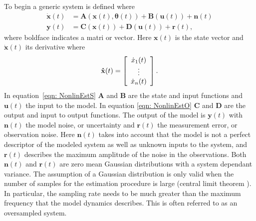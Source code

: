To begin a generic system is defined where \begin{align}
\label{eqn: NonlinEstS}
\mathbf{\dot{x}}(t) &= \mathbf{A}(\mathbf{x}(t),\mathbf{\theta}(t)) + \mathbf{B}(\mathbf{u}(t)) + \mathbf{n}(t)\\
\label{eqn: NonlinEstO}
\mathbf{y}(t)  &= \mathbf{C}(\mathbf{x}(t)) +\mathbf{D}(\mathbf{u}(t))+\mathbf{r}(t),
\end{align} where boldface indicates a matri or vector. Here $\mathbf{x}(t)$ is the state vector and $\dot{\mathbf{x}}(t)$ its derivative where
\[ \mathbf{\dot{x}}(t) = \left[ \begin{array}[pos]{c}
\dot{x}_{1}(t)\\
\vdots \\
\dot{x}_{n}(t) \end{array} \right] .\] In equation~\ref{eqn: NonlinEstS} $\mathbf{A}$ and $\mathbf{B}$ are the state and input functions and $\mathbf{u}(t)$ the input to the model. In equation \ref{eqn: NonlinEstO} $\mathbf{C}$ and $\mathbf{D}$ are the output and input to output functions. The output of the model is $\mathbf{y}(t)$ with $\mathbf{n}(t)$ the model noise, or uncertainty and $\mathbf{r}(t)$ the measurement error, or observation noise. Here $\mathbf{n}(t)$ takes into account that the model is not a perfect descriptor of the modeled system as well as unknown inputs to the system, and $\mathbf{r}(t)$ describes the maximum amplitude of the noise in the observations. Both $\mathbf{n}(t)$ and $\mathbf{r}(t)$ are zero mean Gaussian distributions with a system dependant variance. The assumption of a Gaussian distribution is only valid when the number of samples for the estimation procedure is large (central limit theorem \iref). In particular, the sampling rate needs to be much greater than the maximum frequency that the model dynamics describes. This is often referred to as an oversampled system.

